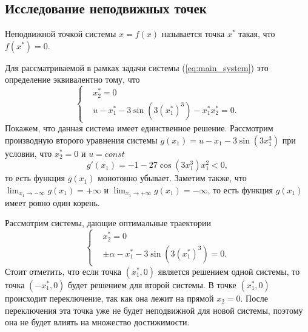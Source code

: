 \subsection{Исследование неподвижных точек}
\begin{definition}
        Неподвижной точкой системы $x = f(x)$ называется точка $x^*$ такая, что $f(x^*) = 0$.
\end{definition}
Для рассматриваемой в рамках задачи системы (\ref{eq:main_system}) это определение эквивалентно тому, что
$$
        \left\{
        \begin{aligned}
                & x_2^* = 0 \\
                & u - x_1^* - 3 \sin(3(x_1^*)^3) - x_1^* x_2^* = 0.
        \end{aligned}
        \right.
$$
Покажем, что данная система имеет единственное решение. Рассмотрим производную второго уравнения системы $g(x_1) = u - x_1 -  3 \sin(3x_1^3)$ при условии, что $x_2^* = 0$ и $u = const$
$$
        g'(x_1) = - 1 - 27\cos(3x_1^3)x_1^2 < 0,
$$
то есть функция $g(x_1)$ монотонно убывает. Заметим также, что $\lim_{x_1\to-\infty}g(x_1) = +\infty$ и $\lim_{x_1\to+\infty}g(x_1) = -\infty$, то есть функция $g(x_1)$ имеет ровно один корень.

Рассмотрим системы, дающие оптимальные траектории
$$
        \left\{
        \begin{aligned}
                & x_2^* = 0 \\
                & \pm \alpha - x_1^* - 3 \sin(3(x_1^*)^3) = 0.
        \end{aligned}
        \right.
$$
Стоит отметить, что если точка $(x_1^*, 0)$ является решением одной системы, то точка $(-x_1^*, 0)$ будет решением для второй системы. В точке $(x_1^*, 0)$ происходит переключение, так как она лежит на прямой $x_2 = 0$. После переключения эта точка уже не будет неподвижной для новой системы, поэтому она не будет влиять на множество достижимости.